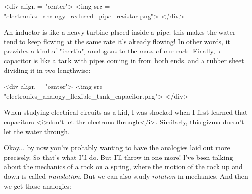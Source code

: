 <div align = "center">
<img src = "electronics_analogy_reduced_pipe_resistor.png">
</div>

An inductor is like a heavy turbine placed inside a pipe: this makes
the water tend to keep flowing at the same rate it's already flowing!
In other words, it provides a kind of "inertia", analogous
to the mass of our rock.  Finally, a capacitor is like a tank with
pipes coming in from both ends, and a rubber sheet dividing it in two
lengthwise:

<div align = "center">
<img src = "electronics_analogy_flexible_tank_capacitor.png">
</div>

When studying electrical circuits as a kid, I was shocked when I first
learned that capacitors <i>don't let the electrons through</i>.
Similarly, this gizmo doesn't let the water through.

Okay... by now you're probably wanting to have the analogies laid out
more precisely.  So that's what I'll do.  But I'll throw in one more!
I've been talking about the mechanics of a rock on a spring, where the
motion of the rock up and down is called \emph{translation}.  But we can
also study \emph{rotation} in mechanics.  And then we get these analogies:




